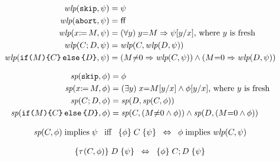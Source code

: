 \begin{align*}
  \textit{wlp}(\mathtt{skip},\psi) &= \psi
  \\
  \textit{wlp}(\mathtt{abort},\psi) &= \mkern.6mu\mathsf{ff}\mkern.6mu
  \\
  \textit{wlp}(x\mathtt{:}\mkern-1mu\mathtt{=}\, M,\psi) &= (\forall y)\; y{=}M \Rightarrow \psi[y/x] \text{, where $y$ is fresh}
  \\
  \textit{wlp}(C;D,\psi) &= \textit{wlp}(C,\textit{wlp}(D,\psi))
  \\
  \textit{wlp}(\mathtt{if}\allowbreak\texttt{(}M\texttt{)}\allowbreak\texttt{\{} C\texttt{\}}\,\allowbreak\mathtt{else}\allowbreak\,\texttt{\{} D\texttt{\}},\psi) &=
  (M{\neq}0\Rightarrow \textit{wlp}(C,\psi)) \land (M{=}0\Rightarrow \textit{wlp}(D,\psi))
\end{align*}

\begin{align*}
  \textit{sp}(\mathtt{skip},\phi) &= \phi
  \\
  \textit{sp}(x\mathtt{:}\mkern-1mu\mathtt{=}\, M,\phi) &= (\exists y)\;x{=}M[y/x]  \land \phi[y/x] \text{, where $y$ is fresh}
  \\
  \textit{sp}(C;D,\phi) &= \textit{sp}(D,\textit{sp}(C,\phi))
  \\
  \textit{sp}(\mathtt{if}\allowbreak\texttt{(}M\texttt{)}\allowbreak\texttt{\{} C\texttt{\}}\,\allowbreak\mathtt{else}\allowbreak\,\texttt{\{} D\texttt{\}},\phi) &=
  \textit{sp}(C, (M{\neq}0\land \phi)) \land \textit{sp}(D, (M{=}0\land \phi))
\end{align*}

\begin{align*}
  \fsp(\aCmd,\aForm) \textimplies \bForm
  \;\;\textiff\;\;
  \hoare{\aForm}{\aCmd}{\bForm} %
  \;\;\Leftrightarrow\;\;
  \aForm \textimplies \fwlp(\aCmd,\bForm)
\end{align*}

\begin{align*}
  \hoare{\aTr(\aCmd,\aForm)}{\bCmd}{\bForm} %
  \;\;\Leftrightarrow\;\;
  \hoare{\aForm}{\aCmd\SEMI\bCmd}{\bForm} %
\end{align*}
